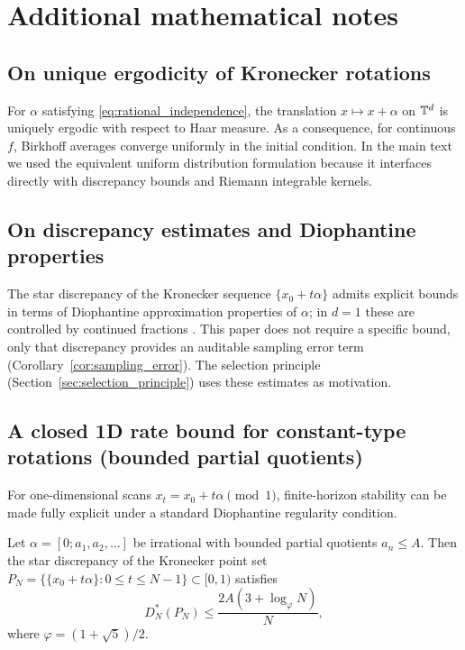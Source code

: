 
\section{Additional mathematical notes}
\label{app:additional_notes}

\subsection{On unique ergodicity of Kronecker rotations}

For $\alpha$ satisfying \eqref{eq:rational_independence}, the translation $x\mapsto x+\alpha$ on $\mathbb{T}^d$ is uniquely ergodic with respect to Haar measure. As a consequence, for continuous $f$, Birkhoff averages converge uniformly in the initial condition. In the main text we used the equivalent uniform distribution formulation because it interfaces directly with discrepancy bounds and Riemann integrable kernels.

\subsection{On discrepancy estimates and Diophantine properties}

The star discrepancy of the Kronecker sequence $\{x_0+t\alpha\}$ admits explicit bounds in terms of Diophantine approximation properties of $\alpha$; in $d=1$ these are controlled by continued fractions \cite{KuipersNiederreiter1974,IosifescuKraaikamp2002}. This paper does not require a specific bound, only that discrepancy provides an auditable sampling error term (Corollary~\ref{cor:sampling_error}). The selection principle (Section~\ref{sec:selection_principle}) uses these estimates as motivation.

\subsection{A closed 1D rate bound for constant-type rotations (bounded partial quotients)}
\label{app:1d_discrepancy_constant_type}

For one-dimensional scans $x_t=x_0+t\alpha\pmod{1}$, finite-horizon stability can be made fully explicit under a standard Diophantine regularity condition.

\begin{proposition}
\label{prop:1d_discrepancy_log_over_n}
Let $\alpha=[0;a_1,a_2,\dots]$ be irrational with bounded partial quotients $a_n\le A$. Then the star discrepancy of the Kronecker point set $P_N=\{\{x_0+t\alpha\}:0\le t\le N-1\}\subset[0,1)$ satisfies
\begin{equation}
\label{eq:1d_discrepancy_log_over_n}
D_N^\ast(P_N) \le \frac{2A(3+\log_\varphi N)}{N},
\end{equation}
where $\varphi=(1+\sqrt{5})/2$.
\end{proposition}

